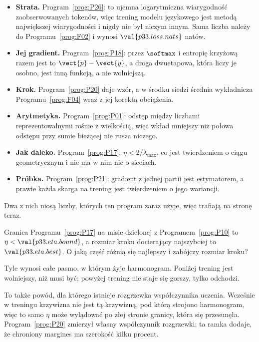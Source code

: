 \begin{fr}
\begin{ansblock}
\begin{itemize}
\item \textbf{Strata.} Program~\ref{prog:P26}: to ujemna logarytmiczna
  wiarygodność zaobserwowanych tokenów, więc trening modelu językowego jest
  metodą największej wiarygodności i nigdy nie był niczym innym. Sama liczba
  należy do Programu~\ref{prog:F02} i wynosi $\val{p33.loss.nats}$ natów.
\item \textbf{Jej gradient.} Program~\ref{prog:P18}: przez $\softmax$ i
  entropię krzyżową razem jest to $\vect{p} - \vect{y}$, a droga
  dwuetapowa, która liczy je osobno, jest inną funkcją, a nie wolniejszą.
\item \textbf{Krok.} Program~\ref{prog:P20} daje wzór, a w środku siedzi
  średnia wykładnicza Programu~\ref{prog:F04} wraz z jej korektą obciążenia.
\item \textbf{Arytmetyka.} Program~\ref{prog:P01}: odstęp między liczbami
  reprezentowalnymi rośnie z wielkością, więc wkład mniejszy niż połowa
  odstępu przy sumie bieżącej nie rusza niczego.
\item \textbf{Jak daleko.} Program~\ref{prog:P17}:
  $\eta < 2/\lambda_{\max}$, co jest twierdzeniem o ciągu geometrycznym i nie
  ma w nim nic o sieciach.
\item \textbf{Próbka.} Program~\ref{prog:P21}: gradient z jednej partii jest
  estymatorem, a prawie każda skarga na trening jest twierdzeniem o jego
  wariancji.
\end{itemize}
\end{ansblock}
\end{fr}


\begin{fr}
Dwa z nich niosą liczby, których ten program zaraz użyje, więc trafiają na
stronę teraz.

Granica Programu~\ref{prog:P17} na misie dzielonej z Programem~\ref{prog:P10}
to $\eta < \val{p33.eta.bound}$, a rozmiar kroku docierający najszybciej to
$\val{p33.eta.best}$. O jaką część różnią się najlepszy i zabójczy rozmiar
kroku?
\dotline
\nextframe
\end{fr}

\begin{fr}
Tyle wynosi całe pasmo, w którym żyje harmonogram. Poniżej trening jest
wolniejszy, niż musi być; powyżej trening nie staje się gorszy, tylko odchodzi.

\begin{aibox}
To także powód, dla którego istnieje rozgrzewka współczynnika uczenia.
Wcześnie w treningu krzywizna nie jest tą krzywizną, pod którą strojono
harmonogram, więc to samo $\eta$ może wylądować po złej stronie granicy, która
się przesunęła. Program~\ref{prog:P20} zmierzył własny współczynnik rozgrzewki;
ta ramka dodaje, że chroniony margines ma szerokość kilku procent.
\end{aibox}
\end{fr}

